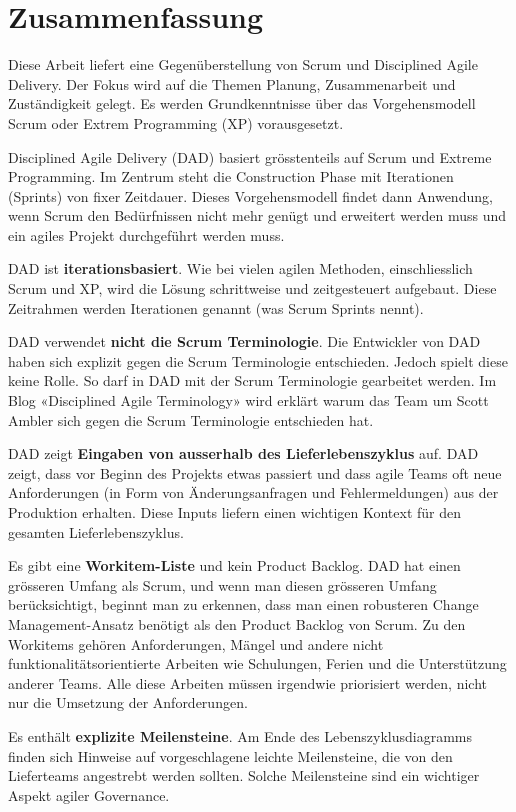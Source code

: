\chapter*{Zusammenfassung}
\thispagestyle{fancy}

Diese Arbeit liefert eine Gegenüberstellung von Scrum und Disciplined Agile Delivery. Der Fokus wird auf die Themen Planung, Zusammenarbeit und Zuständigkeit gelegt. Es werden Grundkenntnisse über das Vorgehensmodell Scrum oder Extrem Programming (XP) vorausgesetzt.

Disciplined Agile Delivery (DAD) basiert grösstenteils auf Scrum und Extreme Programming. Im Zentrum steht die Construction Phase mit Iterationen (Sprints) von fixer Zeitdauer. Dieses Vorgehensmodell findet dann Anwendung, wenn Scrum den Bedürfnissen nicht mehr genügt und erweitert werden muss und ein agiles Projekt durchgeführt werden muss.

DAD ist \textbf{iterationsbasiert}. Wie bei vielen agilen Methoden, einschliesslich Scrum und XP, wird die Lösung schrittweise und zeitgesteuert aufgebaut. Diese Zeitrahmen werden Iterationen genannt (was Scrum Sprints nennt).

DAD verwendet \textbf{nicht die Scrum Terminologie}. Die Entwickler von DAD haben sich explizit gegen die Scrum Terminologie entschieden. Jedoch spielt diese keine Rolle. So darf in DAD mit der Scrum Terminologie gearbeitet werden. Im Blog «Disciplined Agile Terminology»\cite{blogTerminology} wird erklärt warum das Team um Scott Ambler sich gegen die Scrum Terminologie entschieden hat.

DAD zeigt \textbf{Eingaben von ausserhalb des Lieferlebenszyklus} auf. DAD zeigt, dass vor Beginn des Projekts etwas passiert und dass agile Teams oft neue Anforderungen (in Form von Änderungsanfragen und Fehlermeldungen) aus der Produktion erhalten. Diese Inputs liefern einen wichtigen Kontext für den gesamten Lieferlebenszyklus.

Es gibt eine \textbf{Workitem-Liste} und kein Product Backlog. DAD hat einen grösseren Umfang als Scrum, und wenn man diesen grösseren Umfang berücksichtigt, beginnt man zu erkennen, dass man einen robusteren Change Management-Ansatz benötigt als den Product Backlog von Scrum. Zu den Workitems gehören Anforderungen, Mängel und andere nicht funktionalitätsorientierte Arbeiten wie Schulungen, Ferien und die Unterstützung anderer Teams. Alle diese Arbeiten müssen irgendwie priorisiert werden, nicht nur die Umsetzung der Anforderungen.

Es enthält \textbf{explizite Meilensteine}. Am Ende des Lebenszyklusdiagramms finden sich Hinweise auf vorgeschlagene leichte Meilensteine, die von den Lieferteams angestrebt werden sollten. Solche Meilensteine sind ein wichtiger Aspekt agiler Governance.

